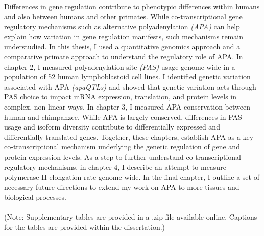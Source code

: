 \abstract

Differences in gene regulation contribute to phenotypic differences within humans and also between humans and other primates. While co-transcriptional gene regulatory mechanisms such as alternative polyadenylation \emph{(APA)} can help explain how variation in gene regulation manifests, such mechanisms remain understudied. In this thesis, I used a quantitative genomics approach and a comparative primate approach to understand the regulatory role of APA. In chapter 2, I measured polyadenylation site \emph{(PAS)} usage genome wide in a population of 52 human lymphoblastoid cell lines. I identified genetic variation associated with APA \emph{(apaQTLs)} and showed that genetic variation acts through PAS choice to impact mRNA expression, translation, and protein levels in complex, non-linear ways. In chapter 3, I measured APA conservation between human and chimpanzee. While APA is largely conserved, differences in PAS usage and isoform diversity contribute to differentially expressed and differentially translated genes. Together, these chapters, establish APA as a key co-transcriptional mechanism underlying the genetic regulation of gene and protein expression levels. As a step to further understand co-transcriptional regulatory mechanisms, in chapter 4, I describe an attempt to measure polymerase II elongation rate genome wide. In the final chapter, I outline a set of necessary future directions to extend my work on APA to more tissues and biological processes.
\\
\\
 (Note:
Supplementary tables are provided in a .zip file available
online. Captions for the tables are provided within the dissertation.)
